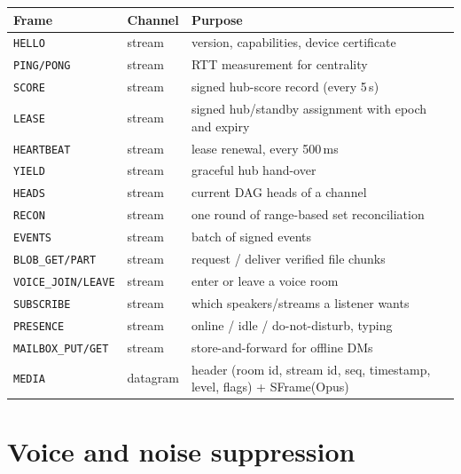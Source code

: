 \documentclass[11pt,a4paper]{article}
\begin{document}
\begin{center}
\small
\begin{tabularx}{\linewidth}{@{}l l Y@{}}
\toprule
\textbf{Frame} & \textbf{Channel} & \textbf{Purpose} \\
\midrule
\texttt{HELLO}       & stream & version, capabilities, device certificate \\
\texttt{PING/PONG}   & stream & RTT measurement for centrality \\
\texttt{SCORE}       & stream & signed hub-score record (every 5\,s) \\
\texttt{LEASE}       & stream & signed hub/standby assignment with epoch and expiry \\
\texttt{HEARTBEAT}   & stream & lease renewal, every 500\,ms \\
\texttt{YIELD}       & stream & graceful hub hand-over \\
\texttt{HEADS}       & stream & current DAG heads of a channel \\
\texttt{RECON}       & stream & one round of range-based set reconciliation \\
\texttt{EVENTS}      & stream & batch of signed events \\
\texttt{BLOB\_GET/PART} & stream & request / deliver verified file chunks \\
\texttt{VOICE\_JOIN/LEAVE} & stream & enter or leave a voice room \\
\texttt{SUBSCRIBE}   & stream & which speakers/streams a listener wants \\
\texttt{PRESENCE}    & stream & online / idle / do-not-disturb, typing \\
\texttt{MAILBOX\_PUT/GET} & stream & store-and-forward for offline DMs \\
\texttt{MEDIA}       & datagram & header (room id, stream id, seq, timestamp, level, flags) + SFrame(Opus) \\
\bottomrule
\end{tabularx}
\end{center}

\section{Voice and noise suppression}
\label{sec:voice}
\end{document}

